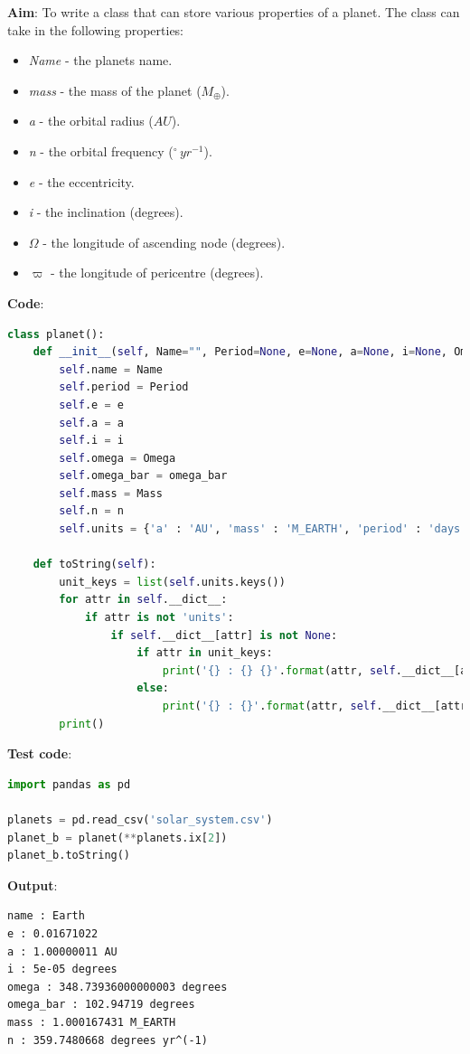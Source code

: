 \documentclass[11pt, oneside]{article}   	%
\begin{document}
\textbf{Aim}: To write a class that can store various properties of a planet. The class can take in the following properties:
\begin{itemize}
\item \textit{Name} - the planets name.
\item \textit{mass} - the mass of the planet ($M_{\oplus}$).
\item \textit{a} - the orbital radius ($AU$).
\item \textit{n} - the orbital frequency ($^{\circ}\, yr^{-1}$).
\item \textit{e} - the eccentricity.
\item \textit{i} - the inclination (degrees).
\item \textit{$\Omega$} - the longitude of ascending node (degrees).
\item \textit{$\varpi$} - the longitude of pericentre (degrees).
\end{itemize}
\textbf{Code}:
\begin{lstlisting}[language=Python, caption={Planet object}]
class planet():
    def __init__(self, Name="", Period=None, e=None, a=None, i=None, Omega=None, omega_bar=None, Mass=None, n=None):
        self.name = Name
        self.period = Period
        self.e = e
        self.a = a
        self.i = i
        self.omega = Omega
        self.omega_bar = omega_bar
        self.mass = Mass
        self.n = n
        self.units = {'a' : 'AU', 'mass' : 'M_EARTH', 'period' : 'days', 'i' : 'degrees', 'omega' : 'degrees', 'omega_bar' : 'degrees', 'n' : 'degrees yr^(-1)'}
        
    def toString(self):
        unit_keys = list(self.units.keys())
        for attr in self.__dict__:
            if attr is not 'units':
                if self.__dict__[attr] is not None:
                    if attr in unit_keys:
                        print('{} : {} {}'.format(attr, self.__dict__[attr], self.units[attr]))
                    else:
                        print('{} : {}'.format(attr, self.__dict__[attr]))
        print()

\end{lstlisting}

\newpage

\textbf{Test code}:
\begin{lstlisting}[language=Python, caption={Test of planet object}]
import pandas as pd

planets = pd.read_csv('solar_system.csv')
planet_b = planet(**planets.ix[2])
planet_b.toString()
\end{lstlisting}
\textbf{Output}:
\begin{verbatim}
name : Earth
e : 0.01671022
a : 1.00000011 AU
i : 5e-05 degrees
omega : 348.73936000000003 degrees
omega_bar : 102.94719 degrees
mass : 1.000167431 M_EARTH
n : 359.7480668 degrees yr^(-1)
\end{verbatim}
\end{document}
